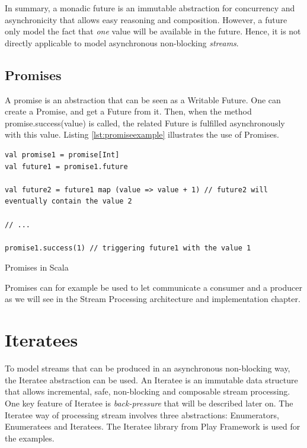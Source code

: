 In summary, a monadic future is an immutable abstraction for concurrency and asynchronicity that allows easy reasoning and composition.
However, a future only model the fact that \textit{one} value will be available in the future. Hence, it is not directly applicable
to model asynchronous non-blocking \textit{streams}.

\subsection{Promises}
\label{sec:promises}
A promise is an abstraction that can be seen as a Writable Future. One can create a Promise, and get a Future from it. Then, when the method promise.success(value) is called,
the related Future is fulfilled asynchronously with this value. Listing \ref{lst:promiseexample} illustrates the use of Promises. 

\begin{listing}[h]
\begin{verbatim}
val promise1 = promise[Int]
val future1 = promise1.future

val future2 = future1 map (value => value + 1) // future2 will eventually contain the value 2

// ...

promise1.success(1) // triggering future1 with the value 1
\end{verbatim}
\caption{Promises in Scala}
\label{lst:promiseexample}
\end{listing}

Promises can for example be used to let communicate a consumer and a producer as we will see in the Stream Processing architecture and implementation chapter.


\section{Iteratees}
\label{sec:iteratees}

To model streams that can be produced in an asynchronous non-blocking way, the Iteratee abstraction can be used. An Iteratee is an immutable data structure
that allows incremental, safe, non-blocking and composable stream processing. One key feature of Iteratee is \textit{back-pressure} that will be described later on.
The Iteratee way of processing stream involves three abstractions: Enumerators, Enumeratees and Iteratees. The Iteratee library from Play Framework 
 is used for the examples.
\\


